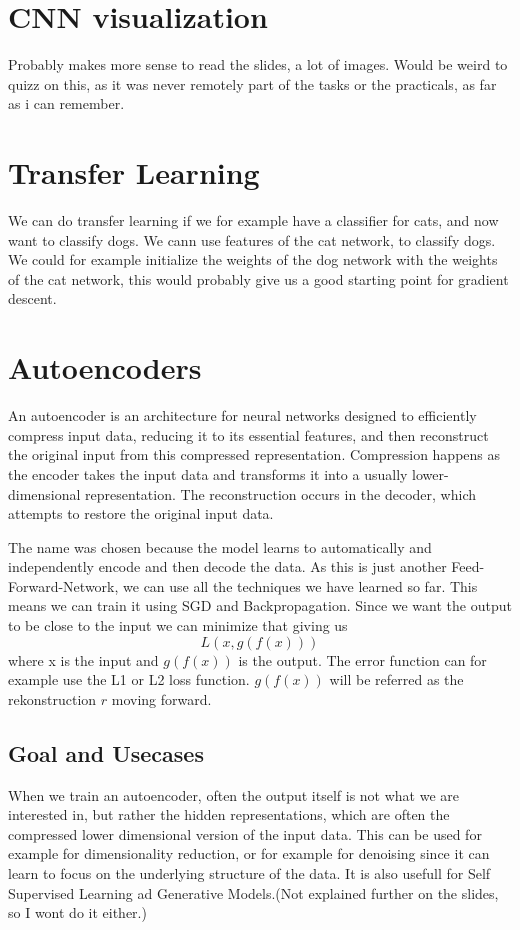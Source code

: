 \documentclass[a4paper]{article}
\begin{document}
\section{CNN visualization}
Probably makes more sense to read the slides, a lot of images. Would be weird to quizz on this, as it was never remotely part of the tasks or the practicals, as far as i can remember. 

\section{Transfer Learning}
We can do transfer learning if we for example have a classifier for cats, and now want to classify dogs. We cann use features of the cat network, to classify dogs. We could for example initialize the weights of the dog network with the weights of the cat network, this would probably give us a good starting point for gradient descent. 

\section{Autoencoders}
An autoencoder is an architecture for neural networks designed to efficiently compress input data, reducing it to its essential features, and then reconstruct the original input from this compressed representation. Compression happens as the encoder takes the input data and transforms it into a usually lower-dimensional representation. The reconstruction occurs in the decoder, which attempts to restore the original input data.

The name was chosen because the model learns to automatically and independently encode and then decode the data.
As this is just another Feed-Forward-Network, we can use all the techniques we have learned so far. This means we can train it using SGD and Backpropagation. Since we want the output to be close to the input we can minimize that giving us \[L(x, g(f(x)))\] where x is the input and $g(f(x)) $ is the output. The error function can for example use the L1 or L2 loss function. $g(f(x))$ will be referred as the rekonstruction 
$r$ moving forward.
\subsection{Goal and Usecases}
When we train an autoencoder, often the output itself is not what we are interested in, but rather the hidden representations, which are often the compressed lower dimensional version of the input data. This can be used for example for dimensionality reduction, or for example for denoising since it can learn to focus on the underlying 
structure of the data. It is also usefull for Self Supervised Learning ad Generative Models.(Not explained further on the slides, so I wont do it either.)
\end{document}
